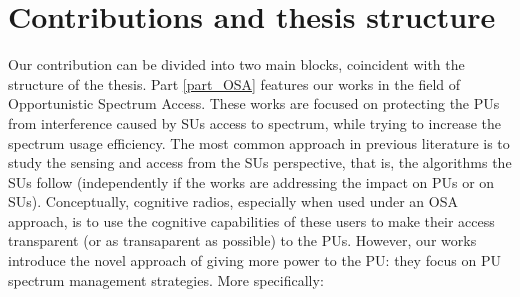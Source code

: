 



\section{Contributions and thesis structure}

Our contribution can be divided into two main blocks, coincident with the structure of the thesis. 
Part \ref{part_OSA} features our works in the field of Opportunistic Spectrum Access. 
These works are focused on protecting the PUs from interference caused by SUs access to spectrum, while trying to increase the spectrum usage efficiency. 
The most common approach in previous literature is to study the sensing and access from the SUs perspective, that is, the algorithms the SUs follow (independently if the works are addressing the impact on PUs or on SUs). Conceptually, cognitive radios, especially when used under an OSA approach, is to use the cognitive capabilities of these users to make their access transparent (or as transaparent as possible) to the PUs. 
However, our works introduce the novel approach of giving more power to the PU: they focus on PU spectrum management strategies. More specifically:
